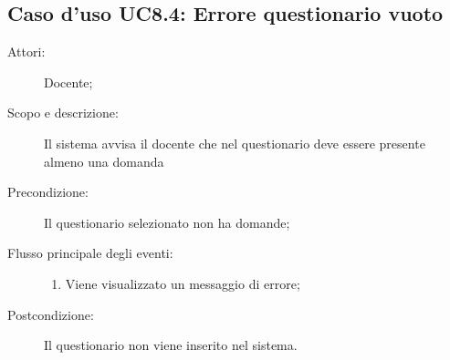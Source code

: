 \subsection{Caso d'uso UC8.4: Errore questionario vuoto}\begin{description}
\item[Attori:] Docente;
\item[Scopo e descrizione:] Il sistema avvisa il docente che nel questionario deve essere presente almeno una domanda
      \item[Precondizione:] Il questionario selezionato non ha domande;

        \item[Flusso principale degli eventi:] \begin{enumerate}
          \item Viene visualizzato un messaggio di errore;

      \end{enumerate}
    \item[Postcondizione:] Il questionario non viene inserito nel sistema.
  \end{description}
\hypertarget{UC9}{}
